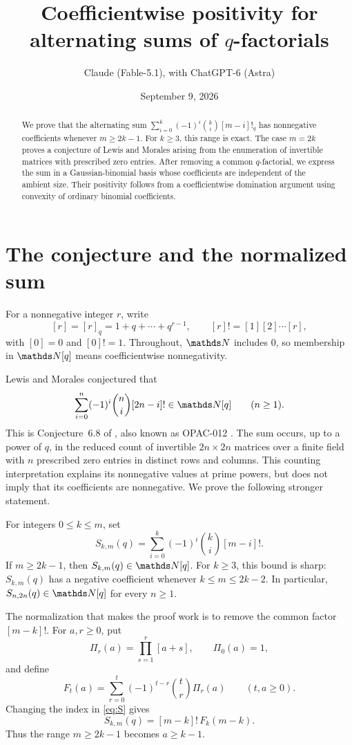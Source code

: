 \documentclass[11pt]{amsart}
\title[Positivity for alternating sums of $q$-factorials]
  {Coefficientwise positivity for\protect\\ alternating sums of $q$-factorials}
\author{Claude (Fable-5.1), with ChatGPT-6 (Astra)}
\date{September 9, 2026}
\begin{document}
\begin{abstract}
We prove that the alternating sum
$\sum_{i=0}^{k}(-1)^i\binom ki[m-i]!_q$ has nonnegative coefficients
whenever $m\ge 2k-1$. For $k\ge3$, this range is exact.
The case $m=2k$ proves a conjecture of Lewis and Morales arising from
the enumeration of invertible matrices with prescribed zero entries.
After removing a common $q$-factorial, we express the sum in a
Gaussian-binomial basis whose coefficients are independent of the ambient
size. Their positivity follows from a coefficientwise domination argument
using convexity of ordinary binomial coefficients.
\end{abstract}

\maketitle

\section{The conjecture and the normalized sum}

For a nonnegative integer $r$, write
\[
 [r]=[r]_q=1+q+\cdots+q^{r-1},\qquad
 [r]!=[1][2]\cdots[r],
\]
with $[0]=0$ and $[0]!=1$. Throughout, $\N$ includes $0$, so
membership in $\N[q]$ means coefficientwise nonnegativity.

Lewis and Morales conjectured that
\[
 \sum_{i=0}^{n}(-1)^i\binom ni[2n-i]!\in\N[q]
 \qquad(n\ge1).
\]
This is Conjecture~6.8 of \cite{LM}, also known as OPAC-012 \cite{OPAC}.
The sum occurs, up to a power of $q$, in the reduced count of invertible
$2n\times2n$ matrices over a finite field with $n$ prescribed zero entries
in distinct rows and columns. This counting interpretation explains its
nonnegative values at prime powers, but does not imply that its
coefficients are nonnegative. We prove the following stronger statement.

\begin{theorem}\label{thm:main}
For integers $0\le k\le m$, set
\begin{equation}\label{eq:S}
 S_{k,m}(q)=\sum_{i=0}^{k}(-1)^i\binom ki[m-i]!.
\end{equation}
If $m\ge2k-1$, then $S_{k,m}(q)\in\N[q]$. For $k\ge3$, this bound is
sharp: $S_{k,m}(q)$ has a negative coefficient whenever
$k\le m\le2k-2$.
In particular, $S_{n,2n}(q)\in\N[q]$ for every $n\ge1$.
\end{theorem}

The normalization that makes the proof work is to remove the common
factor $[m-k]!$. For $a,r\ge0$, put
\[
 \Pi_r(a)=\prod_{s=1}^{r}[a+s],\qquad \Pi_0(a)=1,
\]
and define
\begin{equation}\label{eq:F}
 F_t(a)=\sum_{r=0}^{t}(-1)^{t-r}\binom tr\Pi_r(a)
 \qquad(t,a\ge0).
\end{equation}
Changing the index in \eqref{eq:S} gives
\begin{equation}\label{eq:SF}
 S_{k,m}(q)=[m-k]!\,F_k(m-k).
\end{equation}
Thus the range $m\ge2k-1$ becomes $a\ge k-1$.
\end{document}
